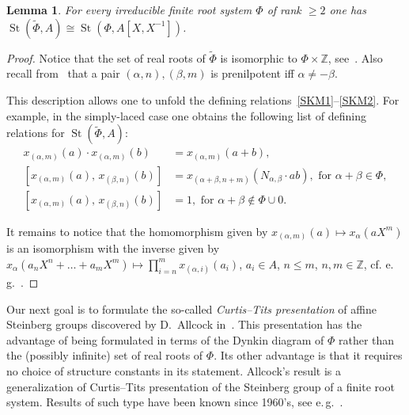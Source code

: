 \documentclass[oneside, 10pt]{amsart}
\DeclareMathOperator{\St}{St}
\newcommand{\ZZ}{\mathbb{Z}}
\newcommand{\inv}{^{-1}}
\numberwithin{equation}{section}
\numberwithin{thm}{section}
\newtheorem{lemma}[thm]{Lemma}
\numberwithin{lemma}{section}
\theoremstyle{definition}
\theoremstyle{remark}
\begin{document}
\begin{lemma} \label{lem:affine-vs-loop} For every irreducible finite root system $\Phi$ of rank $\geq 2$ one has $\St(\widetilde{\Phi}, A) \cong \St(\Phi, A[X, X\inv])$.
\end{lemma}
\begin{proof}
Notice that the set of real roots of $\widetilde{\Phi}$ is isomorphic to $\Phi \times \ZZ$, see~\cite[\S~3]{A16}.
Also recall from~\cite[\S~5]{A16} that a pair $(\alpha, n), (\beta, m)$ is prenilpotent iff $\alpha \neq - \beta$.

This description allows one to unfold the defining relations~\eqref{SKM1}--\eqref{SKM2}.
For example, in the simply-laced case one obtains the following list of defining relations for $\St(\widetilde{\Phi}, A)$:
\begin{align}
x_{(\alpha, m)}(a)\cdot x_{(\alpha, m)}(b)&=x_{(\alpha, m)}(a+b),  \label{AR1}\\
[x_{(\alpha, m)}(a),\,x_{(\beta, n)}(b)]  &=x_{(\alpha+\beta, n+m)}(N_{\alpha,\beta} \cdot ab),\text{ for }\alpha+\beta\in\Phi, \label{AR2} \\
[x_{(\alpha, m)}(a),\,x_{(\beta, n)}(b)]  &=1,\text{ for }\alpha+\beta\not\in\Phi\cup0. \label{AR3}
\end{align}

It remains to notice that the homomorphism given by $x_{(\alpha, m)}(a) \mapsto x_\alpha(aX^m)$ is an isomorphism with the inverse given by
$x_\alpha(a_{n}X^n + \ldots + a_m X^m) \mapsto \prod_{i=n}^m x_{(\alpha, i)}(a_i)$, $a_i \in A$, $n \leq m$, $n, m\in \ZZ$, cf. e.\,g.~\cite[\S~5.1]{LS20}.
\end{proof}

Our next goal is to formulate the so-called \textit{Curtis--Tits presentation} of affine Steinberg groups discovered by D.~Allcock in~\cite{A16, A13}.
This presentation has the advantage of being formulated in terms of the Dynkin diagram of $\Phi$ rather than the (possibly infinite) set of real roots of $\Phi$.
Its other advantage is that it requires no choice of structure constants in its statement.
Allcock's result is a generalization of Curtis--Tits presentation of the Steinberg group of a finite root system.
Results of such type have been known since 1960's, see e.\,g.~\cite[Theorem~B]{DS74}.
\end{document}
